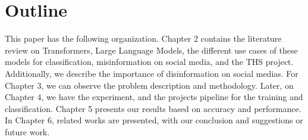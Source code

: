 \section{Outline}
\noindent
This paper has the following organization. Chapter 2 contains the literature review on Transformers, Large Language Models,
the different use cases of these models for classification, misinformation on social media, and the THS project. Additionally, we describe the
importance of disinformation on social medias. For Chapter 3, we can observe the problem description and methodology.
Later, on Chapter 4, we have the experiment, and the projects pipeline for the training and classification. Chapter 5 presents
our results based on accuracy and performance. In Chapter 6, related works are presented, with our conclusion and suggestions 
or future work.